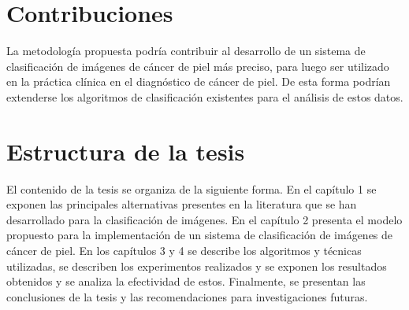 \section*{Contribuciones}

La metodología propuesta podría contribuir al desarrollo de un sistema de clasificación de imágenes de cáncer de piel más preciso, para luego ser utilizado en la práctica clínica en el diagnóstico de cáncer de piel. De esta forma podrían extenderse los algoritmos de clasificación existentes para el análisis de estos datos. 

\section*{Estructura de la tesis}

El contenido de la tesis se organiza de la siguiente forma. En el capítulo 1 se exponen las principales alternativas presentes en la literatura que se han desarrollado para la clasificación de imágenes. En el capítulo 2 presenta el modelo propuesto para la implementación de un sistema de clasificación de imágenes de cáncer de piel. En los capítulos 3 y 4 se describe  los algoritmos y técnicas utilizadas, se describen los experimentos realizados y se exponen los resultados obtenidos y se analiza la efectividad de estos. Finalmente, se presentan las conclusiones de la tesis y las recomendaciones para investigaciones futuras.